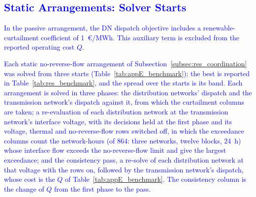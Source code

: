 \subsection{\textcolor{blue}{Static Arrangements: Solver Starts}}
\label{app:results_benchmark}

\textcolor{blue}{
    In the passive arrangement, the DN dispatch objective includes a renewable-curtailment coefficient of 1~\euro/MWh. This auxiliary term is excluded from the reported operating cost $Q$.
}

\textcolor{blue}{
    Each static no-reverse-flow arrangement of Subsection~\ref{subsec:res_coordination} was solved from three starts (Table~\ref{tab:appE_benchmark}); the best is reported in Table~\ref{tab:res_benchmark}, and the spread over the starts is its band. Each arrangement is solved in three phases: 
    the distribution networks' dispatch and the transmission network's dispatch against it, from which the curtailment columns are taken; 
    a re-evaluation of each distribution network at the transmission network's interface voltage, with its decisions held at the first phase and its voltage, thermal and no-reverse-flow rows switched off, in which the exceedance columns count the network-hours (of 864: three networks, twelve blocks, 24~h) whose interface flow exceeds the no-reverse-flow limit and give the largest exceedance; and 
    the consistency pass, a re-solve of each distribution network at that voltage with the rows on, followed by the transmission network's dispatch, whose cost is the $Q$ of Table~\ref{tab:appE_benchmark}. The consistency column is the change of $Q$ from the first phase to the pass.
}

